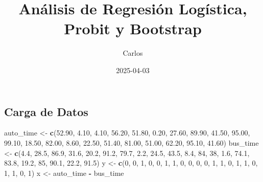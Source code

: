 \documentclass[
]{article}
\title{Análisis de Regresión Logística, Probit y Bootstrap}
\author{Carlos}
\date{2025-04-03}
\newenvironment{Shaded}{\begin{snugshade}}{\end{snugshade}}
\newcommand{\DecValTok}[1]{\textcolor[rgb]{0.00,0.00,0.81}{#1}}
\newcommand{\FloatTok}[1]{\textcolor[rgb]{0.00,0.00,0.81}{#1}}
\newcommand{\FunctionTok}[1]{\textcolor[rgb]{0.13,0.29,0.53}{\textbf{#1}}}
\newcommand{\NormalTok}[1]{#1}
\newcommand{\OtherTok}[1]{\textcolor[rgb]{0.56,0.35,0.01}{#1}}
\newcommand{\SpecialCharTok}[1]{\textcolor[rgb]{0.81,0.36,0.00}{\textbf{#1}}}
\begin{document}
\maketitle

{
\setcounter{tocdepth}{2}
\tableofcontents
}
\subsection{Carga de Datos}\label{carga-de-datos}

\begin{Shaded}
\begin{Highlighting}[]
\NormalTok{auto\_time }\OtherTok{\textless{}{-}} \FunctionTok{c}\NormalTok{(}\FloatTok{52.90}\NormalTok{, }\FloatTok{4.10}\NormalTok{, }\FloatTok{4.10}\NormalTok{, }\FloatTok{56.20}\NormalTok{, }\FloatTok{51.80}\NormalTok{, }\FloatTok{0.20}\NormalTok{, }\FloatTok{27.60}\NormalTok{, }\FloatTok{89.90}\NormalTok{, }\FloatTok{41.50}\NormalTok{,}
               \FloatTok{95.00}\NormalTok{, }\FloatTok{99.10}\NormalTok{, }\FloatTok{18.50}\NormalTok{, }\FloatTok{82.00}\NormalTok{, }\FloatTok{8.60}\NormalTok{, }\FloatTok{22.50}\NormalTok{, }\FloatTok{51.40}\NormalTok{, }\FloatTok{81.00}\NormalTok{, }\FloatTok{51.00}\NormalTok{,}
               \FloatTok{62.20}\NormalTok{, }\FloatTok{95.10}\NormalTok{, }\FloatTok{41.60}\NormalTok{)}
\NormalTok{bus\_time }\OtherTok{\textless{}{-}} \FunctionTok{c}\NormalTok{(}\FloatTok{4.4}\NormalTok{, }\FloatTok{28.5}\NormalTok{, }\FloatTok{86.9}\NormalTok{, }\FloatTok{31.6}\NormalTok{, }\FloatTok{20.2}\NormalTok{, }\FloatTok{91.2}\NormalTok{, }\FloatTok{79.7}\NormalTok{, }\FloatTok{2.2}\NormalTok{, }\FloatTok{24.5}\NormalTok{,}
              \FloatTok{43.5}\NormalTok{, }\FloatTok{8.4}\NormalTok{, }\DecValTok{84}\NormalTok{, }\DecValTok{38}\NormalTok{, }\FloatTok{1.6}\NormalTok{, }\FloatTok{74.1}\NormalTok{, }\FloatTok{83.8}\NormalTok{, }\FloatTok{19.2}\NormalTok{, }\DecValTok{85}\NormalTok{, }\FloatTok{90.1}\NormalTok{, }\FloatTok{22.2}\NormalTok{, }\FloatTok{91.5}\NormalTok{)}
\NormalTok{y }\OtherTok{\textless{}{-}} \FunctionTok{c}\NormalTok{(}\DecValTok{0}\NormalTok{, }\DecValTok{0}\NormalTok{, }\DecValTok{1}\NormalTok{, }\DecValTok{0}\NormalTok{, }\DecValTok{0}\NormalTok{, }\DecValTok{1}\NormalTok{, }\DecValTok{1}\NormalTok{, }\DecValTok{0}\NormalTok{, }\DecValTok{0}\NormalTok{,}
       \DecValTok{0}\NormalTok{, }\DecValTok{0}\NormalTok{, }\DecValTok{1}\NormalTok{, }\DecValTok{1}\NormalTok{, }\DecValTok{0}\NormalTok{, }\DecValTok{1}\NormalTok{, }\DecValTok{1}\NormalTok{, }\DecValTok{0}\NormalTok{, }\DecValTok{1}\NormalTok{, }\DecValTok{1}\NormalTok{, }\DecValTok{0}\NormalTok{, }\DecValTok{1}\NormalTok{)}
\NormalTok{x }\OtherTok{\textless{}{-}}\NormalTok{ auto\_time }\SpecialCharTok{{-}}\NormalTok{ bus\_time}
\end{Highlighting}
\end{Shaded}
\end{document}
